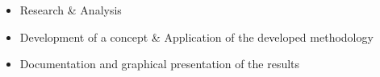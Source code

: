 \begin{task}
    \minisec{\focusname}\smallskip
    \begin{itemize}
        \item Research \& Analysis
        \item Development of a concept \& Application of the developed methodology
        \item Documentation and graphical presentation of the results
    \end{itemize}
\end{task}